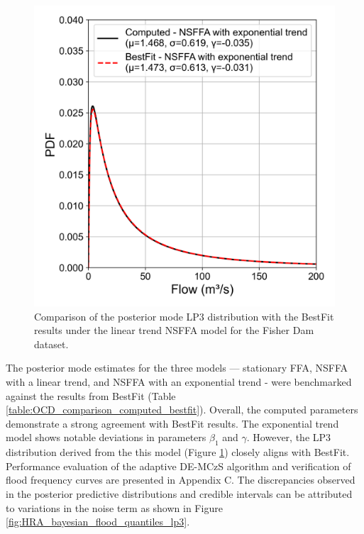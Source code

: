 \begin{figure}[H]
    \centering
    \includegraphics[width=1\linewidth]{_plots/OCD_LP3_exponential_mu_comparison.png}
    \caption{Comparison of the posterior mode LP3 distribution with the BestFit results under the linear trend NSFFA model for the Fisher Dam dataset.}
    \label{fig:OCD_LP3_exponential_mu_comparison}
\end{figure}

The posterior mode estimates for the three models — stationary FFA, NSFFA with a linear trend, and NSFFA with an exponential trend - were benchmarked against the results from BestFit (Table \ref{table:OCD_comparison_computed_bestfit}). Overall, the computed parameters demonstrate a strong agreement with BestFit results. The exponential trend model shows notable deviations in parameters $\beta_1$ and $\gamma$. However, the LP3 distribution derived from the this model (Figure \ref{fig:OCD_LP3_exponential_mu_comparison}) closely aligns with BestFit. Performance evaluation of the adaptive DE-MCzS algorithm and verification of flood frequency curves are presented in Appendix C. The discrepancies observed in the posterior predictive distributions and credible intervals can be attributed to variations in the noise term as shown in Figure \ref{fig:HRA_bayesian_flood_quantiles_lp3}.

